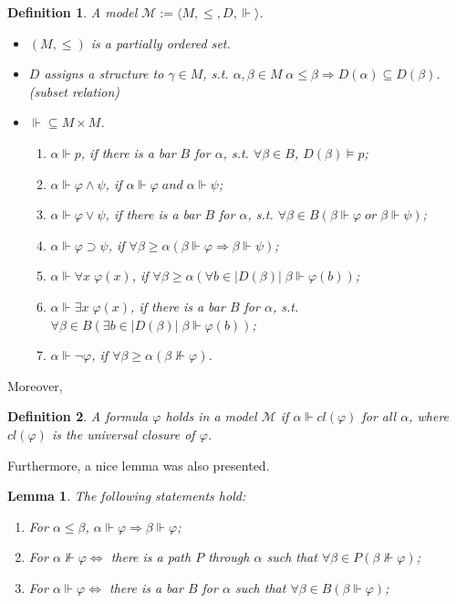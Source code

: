 \documentclass[11pt,a4paper]{article}
\newtheorem{lemma}[theorem]{Lemma}
\newtheorem{mydef}{Definition}
\newcommand{\lto}{\supset}
\newcommand{\sand}{\; and \;}
\newcommand{\sor}{ \; or \;}
\newcommand{\sto}{\Rightarrow}
\begin{document}
\begin{mydef}
A model $\mathcal{M}:= \langle M, \leqslant , D, \Vdash \rangle$.
\begin{itemize}
\item $(M, \leqslant)$ is a partially ordered set.
\item $D$ assigns a structure to $\gamma \in M$, s.t. $\alpha, \beta \in M \; \alpha \leqslant \beta \sto D(\alpha) \subseteq D(\beta)$. (subset relation)
\item $\Vdash \subseteq M \times M$.
\begin{enumerate}
\item $\alpha \Vdash p$, if there is a bar $B$ for $\alpha$, s.t. $\forall \beta \in B$, $D(\beta) \models p$;
\item $\alpha \Vdash \varphi \land \psi$, if $\alpha \Vdash \varphi \sand \alpha \Vdash  \psi$;
\item $\alpha \Vdash \varphi \lor \psi$,  if there is a bar $B$ for $\alpha$, s.t. $\forall \beta \in B (\beta  \Vdash  \varphi \sor \beta  \Vdash  \psi)$;
\item $\alpha \Vdash \varphi \lto \psi$, if $\forall \beta \geqslant \alpha (\beta \Vdash \varphi \sto \beta \Vdash \psi)$;
\item $\alpha \Vdash \forall x\; \varphi(x)$, if $\forall \beta \geqslant \alpha (\forall b \in |D(\beta)| \; \beta \Vdash \varphi(b))$;
\item $\alpha \Vdash \exists x\; \varphi(x)$, if there is a bar $B$ for $\alpha$, s.t. $\forall \beta \in B (\exists b \in |D(\beta)| \; \beta \Vdash \varphi(b))$;
\item $\alpha \Vdash \neg \varphi$, if $\forall \beta \geqslant \alpha (\beta \nVdash \varphi)$.
\end{enumerate}
\end{itemize}
\end{mydef}

Moreover, 

\begin{mydef}
A formula $\varphi$ holds in a model $\mathcal{M}$ if $\alpha \Vdash cl(\varphi)$ for all $\alpha$, where $cl(\varphi)$ is the universal closure of $\varphi$.
\end{mydef}

Furthermore, a nice lemma was also presented.

\begin{lemma}
The following statements hold:
\begin{enumerate}
\item For $\alpha \leqslant \beta$, $\alpha \Vdash \varphi \sto \beta \Vdash \varphi$;
\item For $\alpha \nVdash \varphi \Leftrightarrow$ there is a path $P$ through $\alpha$ such that $\forall \beta \in P (\beta \nVdash \varphi)$;
\item For $\alpha \Vdash \varphi \Leftrightarrow$ there is a bar $B$ for $\alpha$ such that $\forall \beta \in B (\beta \Vdash \varphi)$;
\end{enumerate}
\end{lemma}
\end{document}
